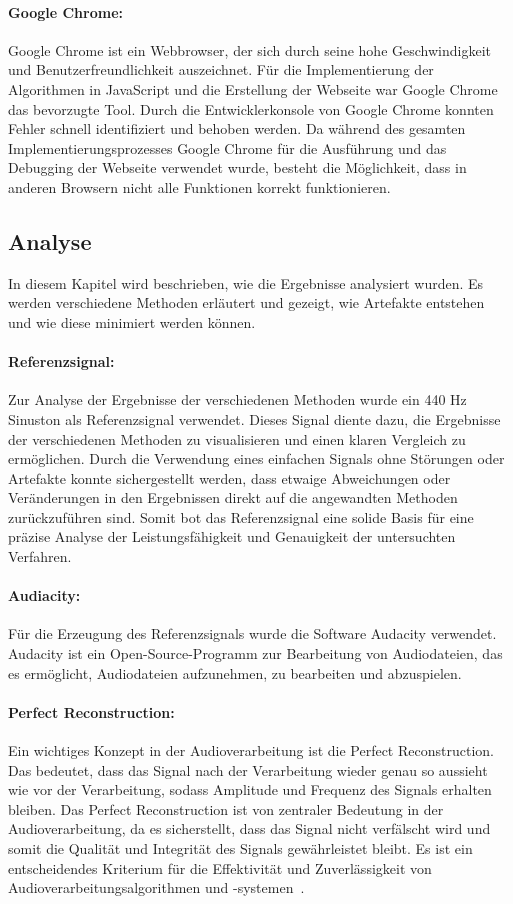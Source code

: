 \paragraph{Google Chrome:}
Google Chrome ist ein Webbrowser, der sich durch seine hohe Geschwindigkeit und Benutzerfreundlichkeit auszeichnet. Für die Implementierung der Algorithmen in JavaScript und die Erstellung der Webseite war Google Chrome das bevorzugte Tool. Durch die Entwicklerkonsole von Google Chrome konnten Fehler schnell identifiziert und behoben werden. Da während des gesamten Implementierungsprozesses Google Chrome für die Ausführung und das Debugging der Webseite verwendet wurde, besteht die Möglichkeit, dass in anderen Browsern nicht alle Funktionen korrekt funktionieren.

\subsection{Analyse}
In diesem Kapitel wird beschrieben, wie die Ergebnisse analysiert wurden. Es werden verschiedene Methoden erläutert und gezeigt, wie Artefakte entstehen und wie diese minimiert werden können.

\paragraph{Referenzsignal:}
Zur Analyse der Ergebnisse der verschiedenen Methoden wurde ein 440 Hz Sinuston als Referenzsignal verwendet. Dieses Signal diente dazu, die Ergebnisse der verschiedenen Methoden zu visualisieren und einen klaren Vergleich zu ermöglichen. Durch die Verwendung eines einfachen Signals ohne Störungen oder Artefakte konnte sichergestellt werden, dass etwaige Abweichungen oder Veränderungen in den Ergebnissen direkt auf die angewandten Methoden zurückzuführen sind. Somit bot das Referenzsignal eine solide Basis für eine präzise Analyse der Leistungsfähigkeit und Genauigkeit der untersuchten Verfahren.

\paragraph{Audiacity:}
Für die Erzeugung des Referenzsignals wurde die Software Audacity verwendet. Audacity ist ein Open-Source-Programm zur Bearbeitung von Audiodateien, das es ermöglicht, Audiodateien aufzunehmen, zu bearbeiten und abzuspielen.

\paragraph{Perfect Reconstruction:}
Ein wichtiges Konzept in der Audioverarbeitung ist die Perfect Reconstruction. Das bedeutet, dass das Signal nach der Verarbeitung wieder genau so aussieht wie vor der Verarbeitung, sodass Amplitude und Frequenz des Signals erhalten bleiben. Das Perfect Reconstruction ist von zentraler Bedeutung in der Audioverarbeitung, da es sicherstellt, dass das Signal nicht verfälscht wird und somit die Qualität und Integrität des Signals gewährleistet bleibt. Es ist ein entscheidendes Kriterium für die Effektivität und Zuverlässigkeit von Audioverarbeitungsalgorithmen und -systemen~\cite{itsp2022}.